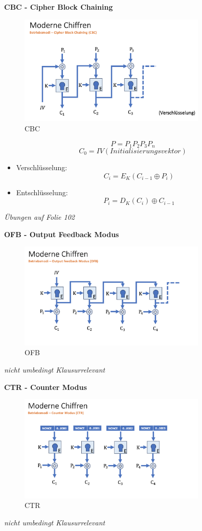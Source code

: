 \documentclass[a4paper,12pt]{article}
\begin{document}
\vspace{1em}
\noindent\textbf{CBC - Cipher Block Chaining}
\begin{figure}[H]
    \centering
    \includegraphics[width=0.8\textwidth]{bilder/cbc.png}
    \caption{CBC}
    \label{fig:cbc}
\end{figure}
\[ P = P_{1}P_{2}P_{3}P_{n}\]
\[C_{0} = IV (Initialisierungsvektor)\]
\begin{itemize}
    \item Verschlüsselung: \[C_{i}=E_{K}(C_{i-1}\oplus P_{i})\]
    \item Entschlüsselung: \[P_{i} = D_{K}(C_{i}) \oplus C_{i-1}\]
\end{itemize}
\textit{Übungen auf Folie 102}

\vspace{1em}
\noindent\textbf{OFB - Output Feedback Modus}
\begin{figure}[H]
    \centering
    \includegraphics[width=0.8\textwidth]{bilder/ofb.png}
    \caption{OFB}
    \label{fig:ofb}
\end{figure}
\textit{nicht umbedingt Klausurrelevant}

\vspace{1em}
\noindent\textbf{CTR - Counter Modus}
\begin{figure}[H]
    \centering
    \includegraphics[width=0.8\textwidth]{bilder/ctr.png}
    \caption{CTR}
    \label{fig:ctr}
\end{figure}
\textit{nicht umbedingt Klausurrelevant}
\end{document}
